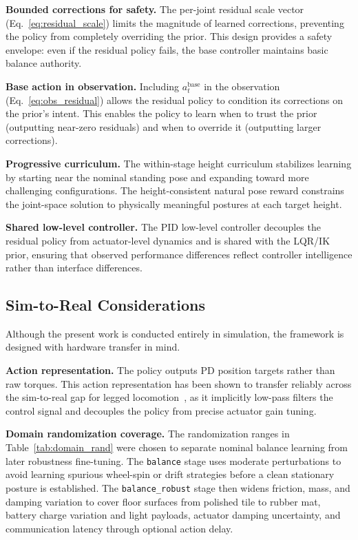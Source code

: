 \documentclass[conference]{IEEEtran}
\begin{document}
\noindent\textbf{Bounded corrections for safety.}
The per-joint residual scale vector (Eq.~\eqref{eq:residual_scale})
limits the magnitude of learned corrections, preventing the policy from
completely overriding the prior. This design provides a safety envelope:
even if the residual policy fails, the base controller maintains basic
balance authority.

\noindent\textbf{Base action in observation.}
Including $a_t^{\mathrm{base}}$ in the observation
(Eq.~\eqref{eq:obs_residual}) allows the residual policy to condition
its corrections on the prior's intent. This enables the policy to learn
when to trust the prior (outputting near-zero residuals) and when to
override it (outputting larger corrections).

\noindent\textbf{Progressive curriculum.}
The within-stage height curriculum stabilizes learning by starting near
the nominal standing pose and expanding toward more challenging
configurations. The height-consistent natural pose reward constrains
the joint-space solution to physically meaningful postures at each
target height.

\noindent\textbf{Shared low-level controller.}
The PID low-level controller decouples the residual policy from
actuator-level dynamics and is shared with the LQR/IK prior, ensuring
that observed performance differences reflect controller intelligence
rather than interface differences.

\subsection{Sim-to-Real Considerations}
\label{sec:sim2real}
Although the present work is conducted entirely in simulation,
the framework is designed with hardware transfer in mind.

\noindent\textbf{Action representation.}
The policy outputs PD position targets rather than raw torques.
This action representation has been shown to transfer reliably across
the sim-to-real gap for legged locomotion~\cite{hwangbo2019learning,rudin2022walk},
as it implicitly low-pass filters the control signal and decouples the policy
from precise actuator gain tuning.

\noindent\textbf{Domain randomization coverage.}
The randomization ranges in Table~\ref{tab:domain_rand} were chosen to
separate nominal balance learning from later robustness fine-tuning.
The \texttt{balance} stage uses moderate perturbations to avoid learning
spurious wheel-spin or drift strategies before a clean stationary posture is
established.
The \texttt{balance\_robust} stage then widens friction, mass, and damping
variation to cover floor surfaces from polished tile to rubber mat, battery
charge variation and light payloads, actuator damping uncertainty, and
communication latency through optional action delay.
\end{document}
